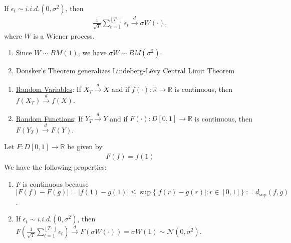\documentclass[11pt]{elegantbook}
\begin{document}
\begin{theorem}
    If $\epsilon_t\sim i.i.d.(0,\sigma^2)$, then
    \begin{equation}
        \begin{aligned}
            \frac{1}{\sqrt{T}}\sum_{t=1}^{\left\lfloor T\cdot\right\rfloor}\epsilon_t \stackrel{d}{\longrightarrow} \sigma W(\cdot),
        \end{aligned}
        \nonumber
    \end{equation}
    where $W$ is a Wiener process.
\end{theorem}
\begin{remark}
    \begin{enumerate}
        \item Since $W\sim BM(1)$, we have $\sigma W \sim BM(\sigma^2)$.
        \item Donsker's Theorem generalizes Lindeberg-Lévy Central Limit Theorem
    \end{enumerate}
\end{remark}

\begin{theorem}
    \begin{enumerate}
        \item \underline{Random Variables}: If $X_T \stackrel{d}{\longrightarrow} X$ and if $f(\cdot): \mathbb{R} \rightarrow \mathbb{R}$ is continuous, then $f(X_T) \stackrel{d}{\longrightarrow} f(X)$.
        \item \underline{Random Functions}: If $Y_T \stackrel{d}{\longrightarrow} Y$ and if $F(\cdot): D[0,1] \rightarrow \mathbb{R}$ is continuous, then $F(Y_T) \stackrel{d}{\longrightarrow} F(Y)$.
    \end{enumerate}
\end{theorem}
\begin{example}
    Let $F: D[0,1] \rightarrow \mathbb{R}$ be given by
    \begin{equation}
        \begin{aligned}
            F(f)=f(1)
        \end{aligned}
        \nonumber
    \end{equation}
    We have the following properties:
    \begin{enumerate}
        \item $F$ is continuous because $|F(f)-F(g)|=|f(1)-g(1)|\leq \sup\{|f(r)-g(r)|:r\in[0,1]\}:=d_{\sup}(f,g)$.
        \item If $\epsilon_t\sim i.i.d.(0,\sigma^2)$, then $F\left(\frac{1}{\sqrt{T}}\sum_{t=1}^{\left\lfloor T\cdot\right\rfloor}\epsilon_t\right)\stackrel{d}{\longrightarrow} F(\sigma W(\cdot))=\sigma W(1)\sim \mathcal{N}(0,\sigma^2)$.
    \end{enumerate}
\end{example}
\end{document}
